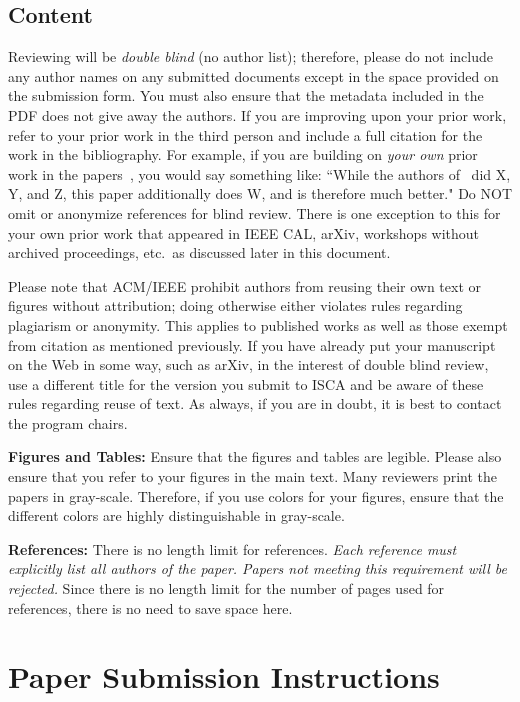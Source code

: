 \documentclass[conference]{IEEEtran}
\begin{document}
\subsection{Content}
Reviewing will be {\em double blind} (no author list); therefore,
please do not include any author names on any submitted documents
except in the space provided on the submission form.  You must also
ensure that the metadata included in the PDF does not give away the
authors. If you are improving upon your prior work, refer to your
prior work in the third person and include a full citation for the
work in the bibliography.  For example, if you are building on {\em
  your own} prior work in the
papers~\cite{nicepaper1,nicepaper2,nicepaper3}, you would say
something like: ``While the authors of~\cite{nicepaper1,nicepaper2,nicepaper3} did X,
Y, and Z, this paper additionally does W, and is therefore much
better."  Do NOT omit or anonymize references for blind review.  There
is one exception to this for your own prior work that appeared in IEEE
CAL, arXiv, workshops without archived proceedings, etc.\ as
discussed later in this document.

Please note that ACM/IEEE prohibit authors from reusing their own text
or figures without attribution; doing otherwise either violates rules
regarding plagiarism or anonymity. This applies to published works as 
well as those exempt from citation as mentioned previously. If you have 
already put your manuscript on the Web in some way, such as arXiv, in 
the interest of double blind review, use a different title for the 
version you submit to ISCA and be aware of these rules regarding reuse 
of text. As always, if you are in doubt, it is best to contact the 
program chairs. 

\noindent\textbf{Figures and Tables:} Ensure that the figures and
tables are legible.  Please also ensure that you refer to your figures
in the main text.  Many reviewers print the papers in
gray-scale. Therefore, if you use colors for your figures, ensure that
the different colors are highly distinguishable in gray-scale.

\noindent\textbf{References:}  There is no length limit for
references. {\em Each reference must explicitly list all authors of
  the paper.  Papers not meeting this requirement will be rejected.}
Since there is no length limit for the number of pages
used for references, there is no need to save space here.


\section{Paper Submission Instructions}
\end{document}

